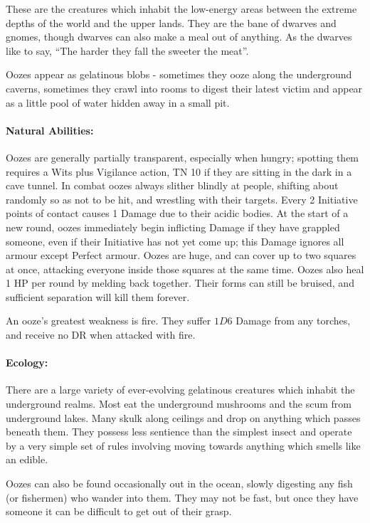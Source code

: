 \begin{multicols}{2}

These are the creatures which inhabit the low-energy areas between the extreme depths of the world and the upper lands.
They are the bane of dwarves and gnomes, though dwarves can also make a meal out of anything.
As the dwarves like  to say, ``The harder they fall the sweeter the meat''.

\label{ooze}
Oozes appear as gelatinous blobs - sometimes they ooze along the underground caverns, sometimes they crawl into rooms to digest their latest victim and appear as a little pool of water hidden away in a small pit.

\paragraph{Natural Abilities:} Oozes are generally partially transparent, especially when hungry; spotting them requires a Wits plus Vigilance action, TN 10 if they are sitting in the dark in a cave tunnel.
In combat oozes always slither blindly at people, shifting about randomly so as not to be hit, and wrestling with their targets.
Every 2 Initiative points of contact causes 1 Damage due to their acidic bodies.
At the start of a new round, oozes immediately begin inflicting Damage if they have grappled someone, even if their Initiative has not yet come up; this Damage ignores all armour except Perfect armour.
Oozes are huge, and can cover up to two squares at once, attacking everyone inside those squares at the same time.
Oozes also heal 1 HP per round by melding back together.
Their forms can still be bruised, and sufficient separation will kill them forever.

An ooze's greatest weakness is fire.
They suffer $1D6$ Damage from any torches, and receive no DR when attacked with fire.

\paragraph{Ecology:} There are a large variety of ever-evolving gelatinous creatures which inhabit the underground realms.  Most eat the underground mushrooms and the scum from underground lakes.  Many skulk along ceilings and drop on anything which passes beneath them.  They possess less sentience than the simplest insect and operate by a very simple set of rules involving moving towards anything which smells like an edible.

Oozes can also be found occasionally out in the ocean, slowly digesting any fish (or fishermen) who wander into them.
They may not be fast, but once they have someone it can be difficult to get out of their grasp.


\end{multicols}
